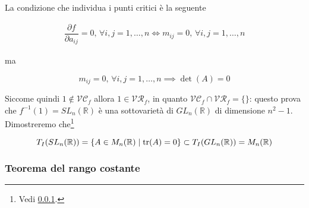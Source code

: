 La condizione che individua i punti critici è la seguente

\begin{align}
	\dfrac{\partial f}{\partial a_{ij}} = 0, \, \forall i,j=1,\dots,n \iff m_{ij} = 0, \, \forall i,j=1,\dots,n
\end{align}

ma

\begin{equation}
	m_{ij} = 0, \, \forall i,j=1,\dots,n \implies \det(A) = 0
\end{equation}

Siccome quindi $ 1 \notin \mathcal{VC}_{f} $ allora $ 1 \in \mathcal{VR}_{f} $, in quanto $ \mathcal{VC}_{f} \cap \mathcal{VR}_{f} = \{\} $: questo prova che $ f^{-1}(1) = SL_{n}(\mathbb{R}) $ è una sottovarietà di $ GL_{n}(\mathbb{R}) $ di dimensione $ n^{2}-1 $.\\
Dimostreremo che\footnote{%
	Vedi \ref{}.}

\begin{equation}
	T_{I}(SL_{n}(\mathbb{R})) = \{ A \in M_{n}(\mathbb{R}) \mid \tr(A)=0 \} \subset T_{I}(GL_{n}(\mathbb{R})) = M_{n}(\mathbb{R})
\end{equation}

\subsubsection{Teorema del rango costante}

